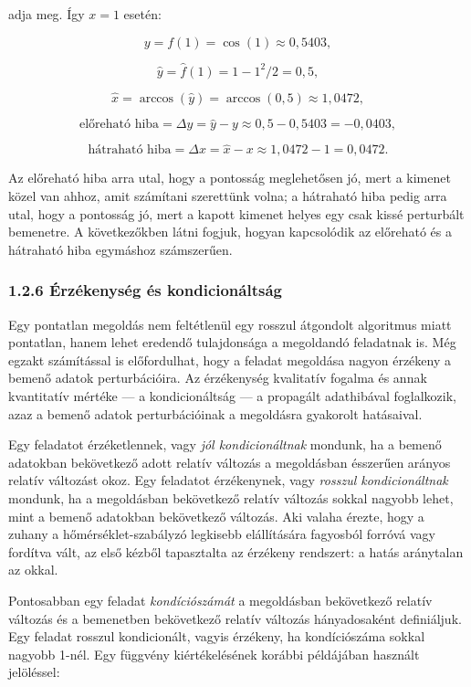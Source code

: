 \documentclass[
  magyar,
  11pt]{article}
\begin{document}
adja meg. Így \(x = 1\) esetén:

\[y = f(1) = \cos(1) \approx 0{,}5403,\]

\[\hat{y} = \hat{f}(1) = 1 - 1^2/2 = 0{,}5,\]

\[\hat{x} = \arccos(\hat{y}) = \arccos(0{,}5) \approx 1{,}0472,\]

\[\text{előreható hiba} = \Delta y = \hat{y} - y \approx 0{,}5 - 0{,}5403 = -0{,}0403,\]

\[\text{hátraható hiba} = \Delta x = \hat{x} - x \approx 1{,}0472 - 1 = 0{,}0472.\]

Az előreható hiba arra utal, hogy a pontosság meglehetősen jó, mert a
kimenet közel van ahhoz, amit számítani szerettünk volna; a hátraható
hiba pedig arra utal, hogy a pontosság jó, mert a kapott kimenet helyes
egy csak kissé perturbált bemenetre. A következőkben látni fogjuk,
hogyan kapcsolódik az előreható és a hátraható hiba egymáshoz
számszerűen.

\subsubsection{1.2.6 Érzékenység és
kondicionáltság}\label{uxe9rzuxe9kenysuxe9g-uxe9s-kondicionuxe1ltsuxe1g}

Egy pontatlan megoldás nem feltétlenül egy rosszul átgondolt algoritmus
miatt pontatlan, hanem lehet eredendő tulajdonsága a megoldandó
feladatnak is. Még egzakt számítással is előfordulhat, hogy a feladat
megoldása nagyon érzékeny a bemenő adatok perturbációira. Az érzékenység
kvalitatív fogalma és annak kvantitatív mértéke --- a kondicionáltság
--- a propagált adathibával foglalkozik, azaz a bemenő adatok
perturbációinak a megoldásra gyakorolt hatásaival.

Egy feladatot érzéketlennek, vagy \emph{jól kondicionáltnak} mondunk, ha
a bemenő adatokban bekövetkező adott relatív változás a megoldásban
ésszerűen arányos relatív változást okoz. Egy feladatot érzékenynek,
vagy \emph{rosszul kondicionáltnak} mondunk, ha a megoldásban
bekövetkező relatív változás sokkal nagyobb lehet, mint a bemenő
adatokban bekövetkező változás. Aki valaha érezte, hogy a zuhany a
hőmérséklet-szabályzó legkisebb elállítására fagyosból forróvá vagy
fordítva vált, az első kézből tapasztalta az érzékeny rendszert: a hatás
aránytalan az okkal.

Pontosabban egy feladat \emph{kondíciószámát} a megoldásban bekövetkező
relatív változás és a bemenetben bekövetkező relatív változás
hányadosaként definiáljuk. Egy feladat rosszul kondicionált, vagyis
érzékeny, ha kondíciószáma sokkal nagyobb 1-nél. Egy függvény
kiértékelésének korábbi példájában használt jelöléssel:
\end{document}
